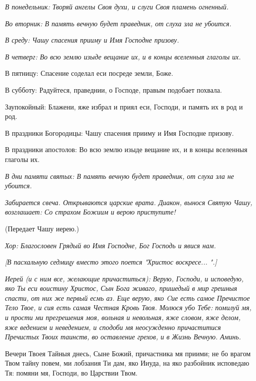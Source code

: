 \itshape В понедельник:\normalfont{} Творяй ангелы Своя духи, и слуги Своя пламень огненный. 


\itshape Во вторник:\normalfont{} В память вечную будет праведник, от слуха зла не убоится. 


\itshape В среду:\normalfont{} Чашу спасения прииму и Имя Господне призову. 


\itshape В четверг:\normalfont{} Во всю землю изыде вещание их, и в концы вселенныя глаголы их. \itshape 


  В пятницу:\normalfont{} Спасение соделал еси посреде земли, Боже. \itshape 


  В субботу:\normalfont{} Радуйтеся, праведнии, о Господе, правым подобает похвала. \itshape 


  Заупокойный:\normalfont{} Блажени, яже избрал и приял еси, Господи, и память их в род и род. \itshape 


  В праздники Богородицы:\normalfont{} Чашу спасения прииму и Имя Господне призову. \itshape 


  В праздники апостолов:\normalfont{} Во всю землю изыде вещание их, и в концы вселенныя глаголы их. 


\itshape В дни памяти святых:\normalfont{} В память вечную будет праведник, от слуха зла не убоится. 


\itshape   Забирается свеча\normalfont{}. \itshape  Открываются царские врата. Диакон, вынося Святую Чашу, возглашает: Со страхом Божиим и верою приступите! 


  (Передает Чашу иерею.) \normalfont{}


\itshape Хор:\normalfont{} Благословен Грядый во Имя Господне, Бог Господь и явися нам.


\itshape [В пасхальную седмицу вместо этого поется "Христос воскресе... ".]\normalfont{}


\itshape  Иерей (и с ним все, желающие причаститься):\normalfont{} Верую, Господи, и исповедую, яко Ты еси воистину Христос, Сын Бога живаго, пришедый в мир грешныя спасти, от них же первый есмь аз. Еще верую, яко Cие есть самое Пречистое Тело Твое, и сия есть самая Честная Кровь Твоя. Молюся убо Тебе: помилуй мя, и прости ми прегрешения моя, вольная и невольная, яже словом, яже делом, яже ведением и неведением, и сподоби мя неосужденно причаститися Пречистых Твоих таинств, во оставление грехов, и в Жизнь Вечную. Аминь.


  Вечери Твоея Тайныя днесь, Сыне Божий, причастника мя приими; не бо врагом Твом тайну повем, ми лобзания Ти дам, яко Ииуда, на яко разбойник исповедаю Тя: помяни мя, Господи, во Царствии Твом.


